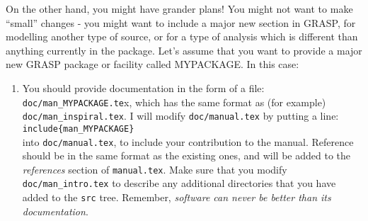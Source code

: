 On the other hand, you might have grander plans!  You might not want
to make ``small'' changes - you
might want to include a major new section in GRASP, for modelling
another type of source, or for a type of analysis which is different
than anything currently in the package.  Let's assume that you
want to provide a major new GRASP package or facility called
MYPACKAGE.  In this case:
\begin{enumerate}
\item
You should provide documentation in the form of a file:
    {\tt doc/man\_MYPACKAGE.te}x, which has the same format as (for example)
    {\tt doc/man\_inspiral.tex}.  I will modify {\tt doc/manual.tex}
    by putting a line:\\
    {\tt include\{man\_MYPACKAGE\}}\\
    into {\tt doc/manual.tex}, to include your
    contribution to the manual. Reference should be in the same format
    as the existing ones, and will be added to the {\it references} section of
    {\tt manual.tex}.  Make sure that you modify {\tt doc/man\_intro.tex} to describe any
    additional directories that you have added to the {\tt src} tree.  Remember, {\it
    software can never
    be better than its documentation}.


\end{enumerate}
